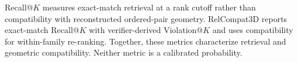 Recall@$K$ measures exact-match retrieval at a rank cutoff rather than
compatibility with reconstructed ordered-pair geometry. RelCompat3D reports exact-match Recall@$K$ with verifier-derived Violation@$K$ and uses compatibility for within-family re-ranking. Together, these metrics characterize retrieval and geometric compatibility. Neither metric is a calibrated probability.
